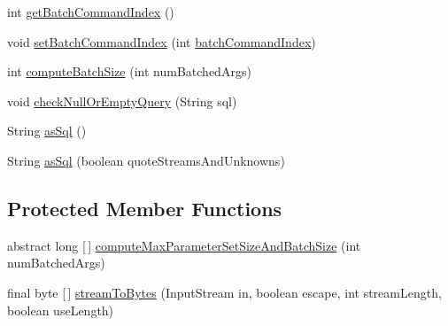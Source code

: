 \begin{DoxyCompactItemize}
\item 
int \mbox{\hyperlink{classcom_1_1mysql_1_1cj_1_1_abstract_prepared_query_ab595548448d9b185687085386f5e5403}{get\+Batch\+Command\+Index}} ()
\item 
void \mbox{\hyperlink{classcom_1_1mysql_1_1cj_1_1_abstract_prepared_query_a1e7c11075138e81c17661fa649b1b779}{set\+Batch\+Command\+Index}} (int \mbox{\hyperlink{classcom_1_1mysql_1_1cj_1_1_abstract_prepared_query_abf8b65895d25af2ce73ef93f141d8c44}{batch\+Command\+Index}})
\item 
int \mbox{\hyperlink{classcom_1_1mysql_1_1cj_1_1_abstract_prepared_query_abaf5a9940a4785f96991f7f6b4d3549c}{compute\+Batch\+Size}} (int num\+Batched\+Args)
\item 
void \mbox{\hyperlink{classcom_1_1mysql_1_1cj_1_1_abstract_prepared_query_a8f315309011b4b60fc8edc517a5da730}{check\+Null\+Or\+Empty\+Query}} (String sql)
\item 
String \mbox{\hyperlink{classcom_1_1mysql_1_1cj_1_1_abstract_prepared_query_a8257fe96b601affc2189c6c0739baf72}{as\+Sql}} ()
\item 
String \mbox{\hyperlink{classcom_1_1mysql_1_1cj_1_1_abstract_prepared_query_a02bd57c8fd71f3defb3ed96ef37542a5}{as\+Sql}} (boolean quote\+Streams\+And\+Unknowns)
\end{DoxyCompactItemize}
\subsection*{Protected Member Functions}
\begin{DoxyCompactItemize}
\item 
abstract long \mbox{[}$\,$\mbox{]} \mbox{\hyperlink{classcom_1_1mysql_1_1cj_1_1_abstract_prepared_query_a29bac70aa2edad992b03494e5f7f97ef}{compute\+Max\+Parameter\+Set\+Size\+And\+Batch\+Size}} (int num\+Batched\+Args)
\item 
final byte \mbox{[}$\,$\mbox{]} \mbox{\hyperlink{classcom_1_1mysql_1_1cj_1_1_abstract_prepared_query_a2b738d5bb8d4d149721d0d59e42253cc}{stream\+To\+Bytes}} (Input\+Stream in, boolean escape, int stream\+Length, boolean use\+Length)
\end{DoxyCompactItemize}
